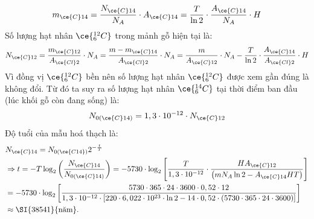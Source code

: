 \begin{ex}
{\begin{enumerate}[label=\alph*)]
			$$
			m_{\ce{C} 14}=\frac{N_{\ce{C} 14}}{N_{A}} \cdot A_{\ce{C} 14}=\frac{T}{\ln 2} \cdot \frac{A_{\ce{C} 14}}{N_{A}} \cdot H
			$$
			Số lượng hạt nhân $\ce{_6^{12}C}$ trong mảnh gỗ hiện tại là:
			$$
			N_{\ce{C} 12}=\frac{m_{\ce{C} 12}}{A_{\ce{Cl} 2}} \cdot N_{A}=\frac{m-m_{\ce{C} 14}}{A_{\ce{Cl} 2}} \cdot N_{A}=\frac{m}{A_{\ce{C} 12}} \cdot N_{A}-\frac{T}{\ln 2} \cdot \frac{A_{\ce{C} 14}}{A_{\ce{Cl} 2}} \cdot H
			$$
			Vì đồng vị $\ce{_6^{12}C}$ bền nên số lượng hạt nhân $\ce{_6^{12}C}$ được xem gần đúng là không đổi. Từ đó ta suy ra số lượng hạt nhân $\ce{_6^{14}C}$ tại thời điểm ban đầu (lúc khối gỗ còn đang sống) là:
			$$
			N_{0(\ce{C}14)}=1,3 \cdot 10^{-12} \cdot N_{\ce{C}12}
			$$
			Độ tuổi của mẫu hoá thạch là:
			$$
			\begin{aligned}
				& N_{\ce{C} 14}=N_{0\left(\ce{C14}\right)} 2^{-\frac{t}{T}} \\
				& \Rightarrow t=-T \log _2\left(\frac{N_{\ce{C} 14}}{N_{0(\ce{C} 14)}}\right)=-5730 \cdot \log_2\left[\frac{T}{1,3 \cdot 10^{-12}} \cdot \frac{H A_{\ce{C} 12}}{\left(m N_A \ln 2-A_{\ce{C} 14} H T\right)}\right] \\
				&=-5730 \cdot \log _2\left[\frac{5730 \cdot 365 \cdot 24 \cdot 3600 \cdot 0,52 \cdot 12}{1,3 \cdot 10^{-12} \cdot\left[220 \cdot 6,022 \cdot 10^{23} \cdot \ln 2-14 \cdot 0,52 \cdot(5730 \cdot 365 \cdot 24 \cdot 3600)\right]}\right] \\
				& \approx \SI{38541}{\text{năm}}.
			\end{aligned}
			$$
		\end{enumerate}
	}
\end{ex}
